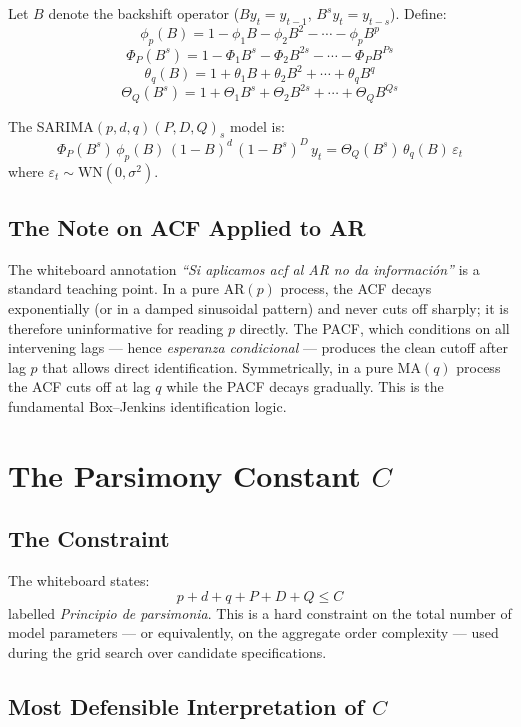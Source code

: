 \documentclass[12pt,a4paper]{article}
\begin{document}
Let $B$ denote the backshift operator ($By_t = y_{t-1}$, $B^s y_t = y_{t-s}$).
Define:
\[
    \phi_p(B) = 1 - \phi_1 B - \phi_2 B^2 - \cdots - \phi_p B^p
\]
\[
    \Phi_P(B^s) = 1 - \Phi_1 B^s - \Phi_2 B^{2s} - \cdots - \Phi_P B^{Ps}
\]
\[
    \theta_q(B) = 1 + \theta_1 B + \theta_2 B^2 + \cdots + \theta_q B^q
\]
\[
    \Theta_Q(B^s) = 1 + \Theta_1 B^s + \Theta_2 B^{2s} + \cdots + \Theta_Q B^{Qs}
\]

The SARIMA$(p,d,q)(P,D,Q)_s$ model is:
\[
    \Phi_P(B^s)\,\phi_p(B)\,(1-B)^d\,(1-B^s)^D\,y_t
    = \Theta_Q(B^s)\,\theta_q(B)\,\varepsilon_t
\]
where $\varepsilon_t\sim\text{WN}(0,\sigma^2)$.

\subsection{The Note on ACF Applied to AR}

The whiteboard annotation \textit{``Si aplicamos acf al AR no da información''}
is a standard teaching point. In a pure AR$(p)$ process, the ACF decays
exponentially (or in a damped sinusoidal pattern) and never cuts off sharply;
it is therefore uninformative for reading $p$ directly. The PACF, which
conditions on all intervening lags — hence \textit{esperanza condicional} —
produces the clean cutoff after lag $p$ that allows direct identification.
Symmetrically, in a pure MA$(q)$ process the ACF cuts off at lag $q$ while the
PACF decays gradually. This is the fundamental Box--Jenkins identification
logic.

\section{The Parsimony Constant $C$}

\subsection{The Constraint}

The whiteboard states:
\[
    p + d + q + P + D + Q \le C
\]
labelled \textit{Principio de parsimonia}. This is a hard constraint on the
total number of model parameters — or equivalently, on the aggregate order
complexity — used during the grid search over candidate specifications.

\subsection{Most Defensible Interpretation of $C$}
\end{document}
